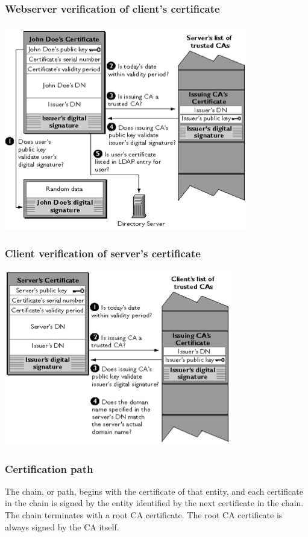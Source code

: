 \documentclass[10pt]{article}
\begin{document}
\subsubsection{Webserver verification of client's certificate}
\begin{center}
	\includegraphics[scale=0.5]{ssl_server_verification.png}
\end{center}
\subsubsection{Client verification of server's certificate}
\begin{center}
	\includegraphics[scale=0.5]{ssl_client_verification.png}
\end{center}
\subsubsection{Certification path}
The chain, or path, begins with the certificate of that entity, and each certificate in the chain is signed by the entity identified by the next certificate in the chain. The chain terminates with a root CA certificate. The root CA certificate is always signed by the CA itself.
\end{document}
